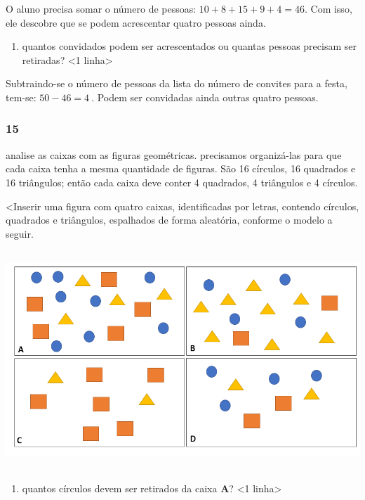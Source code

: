 O aluno precisa somar o número de pessoas: \(10 + 8 + 15 + 9 + 4 = 46\). Com isso, ele descobre que se podem acrescentar quatro pessoas ainda.

\begin{enumerate}
\def\labelenumi{\Alph{enumi})}
\item
  quantos convidados podem ser acrescentados ou quantas pessoas precisam ser retiradas? \textless{}1 linha\textgreater{}
\end{enumerate}

Subtraindo-se o número de pessoas da lista do número de convites para a festa, tem-se: \(50 - 46 = 4\ \). Podem ser convidadas ainda outras quatro pessoas.

\subsubsection{15}\label{section-22}

analise as caixas com as figuras geométricas. precisamos organizá-las para que cada caixa tenha a mesma quantidade de figuras. São 16 círculos, 16 quadrados e 16 triângulos; então cada caixa deve conter 4 quadrados, 4 triângulos e 4 círculos.

\textless{}Inserir uma figura com quatro caixas, identificadas por
letras, contendo círculos, quadrados e triângulos, espalhados de forma
aleatória, conforme o modelo a seguir.

\includegraphics[width=5.90556in,height=3.22917in]{media/image20.png}

\begin{enumerate}
\def\labelenumi{\Alph{enumi})}
\item
  quantos círculos devem ser retirados da caixa \textbf{A}? \textless{}1
  linha\textgreater{}
\end{enumerate}

